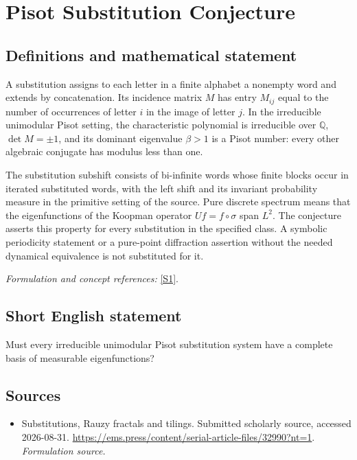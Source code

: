 \documentclass[11pt]{article}
\begin{document}
\section*{\texorpdfstring{Pisot Substitution Conjecture}{Pisot Substitution Conjecture}}\label{statement}
\subsection{Definitions and mathematical statement}
A substitution assigns to each letter in a finite alphabet a nonempty word and extends by concatenation. Its incidence matrix $M$ has entry $M_{ij}$ equal to the number of occurrences of letter $i$ in the image of letter $j$. In the irreducible unimodular Pisot setting, the characteristic polynomial is irreducible over ${\mathbb{Q}}$, $\det M=\pm1$, and its dominant eigenvalue $\beta>1$ is a Pisot number: every other algebraic conjugate has modulus less than one.

The substitution subshift consists of bi-infinite words whose finite blocks occur in iterated substituted words, with the left shift and its invariant probability measure in the primitive setting of the source. Pure discrete spectrum means that the eigenfunctions of the Koopman operator $Uf=f\circ\sigma$ span $L^2$. The conjecture asserts this property for every substitution in the specified class. A symbolic periodicity statement or a pure-point diffraction assertion without the needed dynamical equivalence is not substituted for it.
\par\smallskip\textit{Formulation and concept references:} \href{https://ems.press/content/serial-article-files/32990?nt=1}{[S1]}.

\subsection{Short English statement}
Must every irreducible unimodular Pisot substitution system have a complete basis of measurable eigenfunctions?
\subsection{Sources}
\begin{itemize}
\item[S1]Substitutions, Rauzy fractals and tilings. Submitted scholarly source, accessed 2026-08-31.
\url{https://ems.press/content/serial-article-files/32990?nt=1}.
\textit{Formulation source.}
\end{itemize}
\end{document}
